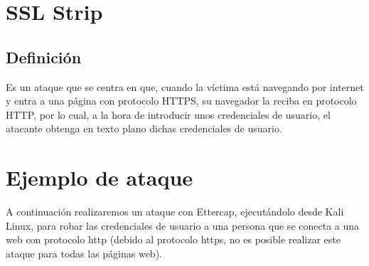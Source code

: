 \documentclass[12pt,letterpaper]{article}
\begin{document}
\section{SSL Strip}
\subsection{Definición}
Es un ataque que se centra en que, cuando la víctima está navegando por internet y entra a una página con protocolo HTTPS, su navegador la reciba en protocolo HTTP, por lo cual, a la hora de introducir unos credenciales de usuario, el atacante obtenga en texto plano dichas credenciales de usuario.


\section{Ejemplo de ataque}
A continuación realizaremos un ataque con Ettercap, ejecutándolo desde Kali Linux, para robar las credenciales de usuario a una persona que se conecta a una web con protocolo http (debido al protocolo https, no es posible realizar este ataque para todas las páginas web).
\end{document}
